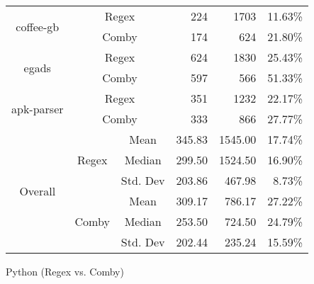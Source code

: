 \documentclass[sigconf,review, anonymous]{acmart}
\begin{document}
{\begin{table}[hbtp]
{\begin{tabular}{|c|c|c|r|r|r|}
\multirow{2}{*}{coffee-gb} & \multicolumn{2}{c|}{Regex} & 224 \hspace{8pt} & 1703 \hspace{8pt} & 11.63\% \\\cline{2-6}
    & \multicolumn{2}{c|}{Comby} & 174 \hspace{8pt} & 624 \hspace{8pt} & 21.80\% \\ \hline
\multirow{2}{*}{egads} & \multicolumn{2}{c|}{Regex} & 624 \hspace{8pt} & 1830 \hspace{8pt} & 25.43\% \\\cline{2-6}
    & \multicolumn{2}{c|}{Comby} & 597 \hspace{8pt} & 566 \hspace{8pt} & 51.33\% \\ \hline
\multirow{2}{*}{apk-parser} & \multicolumn{2}{c|}{Regex} & 351 \hspace{8pt} & 1232 \hspace{8pt} & 22.17\% \\\cline{2-6}
    & \multicolumn{2}{c|}{Comby} & 333 \hspace{8pt} & 866 \hspace{8pt} & 27.77\% \\ \hline

\multirow{6}{*}{Overall} & \multirow{3}{*}{Regex} & Mean & 345.83 & 1545.00  & 17.74\%\\\cline{3-6}
    &   &  Median & 299.50 & 1524.50 & 16.90\%  \\\cline{3-6}
    &   &  Std. Dev & 203.86 & 467.98 & 8.73\%  \\\cline{2-6}

 & \multirow{3}{*}{Comby} & Mean & 309.17 & 786.17 & 27.22\% \\\cline{3-6}
    &   &  Median & 253.50 & 724.50 & 24.79\%  \\\cline{3-6}
    &   &  Std. Dev & 202.44 & 235.24  & 15.59\%  \\\hline


\end{tabular}

}
\end{table}


\begin{table}[hbtp]
\centering
\caption{Python (Regex vs. Comby)}
\label{tab:table_python1}
\resizebox{\columnwidth}{!}{%

}
\end{table}}
\end{document}
